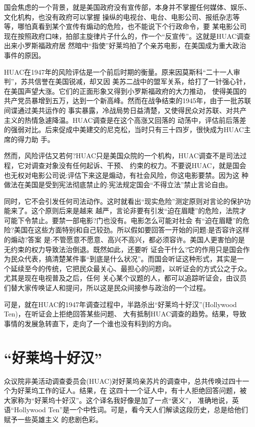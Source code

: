 \documentclass[10pt]{article}
\begin{document}
{国会焦虑的一个背景，就是美国政府没有宣传部，本身并不掌握任何媒体、娱乐、文化机构，也没有政府可以掌握
操纵的电视台、电台、电影公司、报纸杂志等等，哪怕真看到某个宣传有煽动的危险，也不能说下个行政命令，要
某电影公司现在按照政府口味，拍部主旋律片子什么的，作一个``反宣传''。这就是HUAC调查出来小罗斯福政府居
然暗中``指使''好莱坞拍了个亲苏电影，在美国成为重大政治事件的原因。

HUAC在1947年的风险评估是一个前后时期的衡量。原来因莫斯科``二十一人审判''，苏共信誉在美国锐减，却又因
美苏二战中的盟军关系，给打了一针强心针，在美国声望大涨。它们的正面形象又得到小罗斯福政府的大力推动，
使得美国的共产党员暴增到五万，达到一个新高峰。然而在战争结束的1945年，由于一批苏联间谍通过美共运作的
事实暴露，冷战局势日益清楚，又使得民众对苏联、对共产主义的热情急遽降温。HUAC调查是在这个高涨又回落的
动荡中，评估前后落差的强弱对比。后来促成中美建交的尼克松，当时只有三十四岁，很快成为HUAC主席的得力助
手。

然而，风险评估又若何?HUAC只是美国众院的一个机构，HUAC调查不是司法过程，它对调查对象没有任何起诉、干预、
约束的权力。不要说HUAC，就是国会也无权对电影公司说:评估下来这是煽动，有社会风险，你这电影要禁。因为这
种做法在美国是受到宪法彻底禁止的:宪法规定国会``不得立法''禁止言论自由。

同时，它不会引发任何司法动作。这时就看出``现实危险''测定原则对言论的保护功能来了。这个原则后来是越来
越严，言论非要有引发``迫在眉睫''的危险，法院才可能下令禁止。要禁一部电影?门也没有。电影怎么可能对社会
有``迫在眉睫''的危险?美国在这些方面特别和自己较劲。所以假如要回答一开始的问题:是否容许这样的煽动?答案
是:不管愿意不愿意、高兴不高兴，都必须容许。美国人更害怕的是无约束的权力导致法治倒退。既然如此，还要听
证会干什么?它的作用只是国会作为民众代表，搞清楚某件事``到底是什么状况''。而国会听证这种形式，其实是一
个延续至今的传统，它把民众最关心、最担心的问题，以听证会的方式公之于众。尤其是现在电视普及之后，任何
关心某个议题的人，都可以追踪听证会，由议员们替大家传唤证人和提问，所以这是民众间接参与政治的一个过程。

可是，就在HUAC的1947年调查过程中，半路杀出``好莱坞十好汉''(Hollywood Ten)，在听证会上拒绝回答某些问题、
大有抵制HUAC调查的趋势。结果，导致事情的发展急转直下，走向了一个谁也没有料到的方向。

\pagebreak
\section{``好莱坞十好汉''}

众议院非美活动调查委员会(HUAC)对好莱坞亲苏片的调查中，总共传唤过四十一个为好莱坞工作的证人。结果，在
这四十一个证人中，有十人拒绝回答问题，被大家称为``好莱坞十好汉''。这个译名我好像是加了一点``褒义''，
准确地说，英语``Hollywood Ten''是一个中性词。可是，看今天人们解读这段历史，总是给他们赋予一些英雄主义
的悲剧色彩。

}
\end{document}
